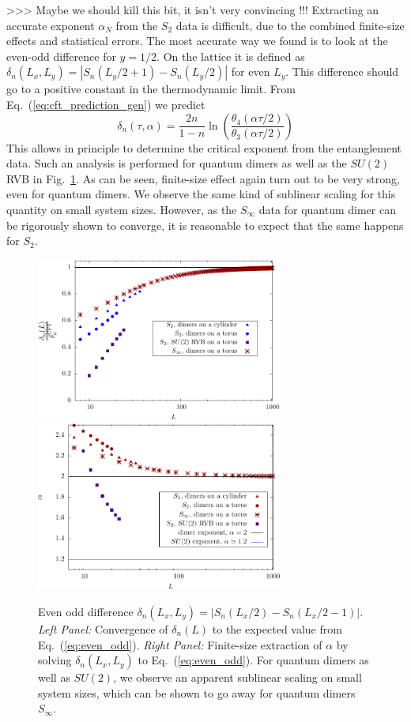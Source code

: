 \documentclass[11pt]{iopart}
\begin{document}
>>> Maybe we should kill this bit, it isn't very convincing !!!
Extracting an accurate exponent $\alpha_N$ from the $S_2$ data is difficult, due to the combined finite-size effects and statistical errors. The most accurate way we found is to look at the even-odd difference for $y=1/2$. On the lattice it is defined as $\delta_n(L_x,L_y)=\left|S_n(L_y/2+1)-S_n(L_y/2)\right|$ for even $L_y$. This difference should go to a positive constant in the thermodynamic limit. From Eq.~(\ref{eq:cft_prediction_gen}) we predict
\begin{equation}\label{eq:even_odd}
 \delta_n(\tau,\alpha)=\frac{2n}{1-n}\ln \left(\frac{\theta_4(\alpha\tau/2)}{\theta_3(\alpha \tau/2)}\right)
\end{equation}
This allows in principle to determine the critical exponent from the entanglement data. Such an analysis is performed for quantum dimers as well as the $SU(2)$ RVB in Fig.~\ref{fig:evenodd}. As can be seen, finite-size effect again turn out to be very strong, even for quantum dimers. We observe the same kind of sublinear scaling for this quantity on small system sizes\cite{Ju2012}. However, as the $S_\infty$ data for quantum dimer can be rigorously shown to converge, it is reasonable to expect that the same happens for $S_2$.
\begin{figure}[ht]
\begin{center}
 \includegraphics[width=8.1cm]{./figures/evenodd.pdf}
 \includegraphics[width=8.1cm]{./figures/evenodd_alpha.pdf}
 \end{center}
 \caption{Even odd difference $\delta_n(L_x,L_y)=|S_n(L_x/2)-S_n(L_x/2-1)|$. \emph{Left Panel:} Convergence of $\delta_n(L)$ to the expected value from Eq.~(\ref{eq:even_odd}). \emph{Right Panel:} Finite-size extraction of $\alpha$ by solving $\delta_n(L_x,L_y)$ to Eq.~(\ref{eq:even_odd}). For quantum dimers as well as $SU(2)$, we observe an apparent sublinear scaling on small system sizes, which can be shown to go away for quantum dimers $S_\infty$.}
 \label{fig:evenodd}
\end{figure}
\end{document}
